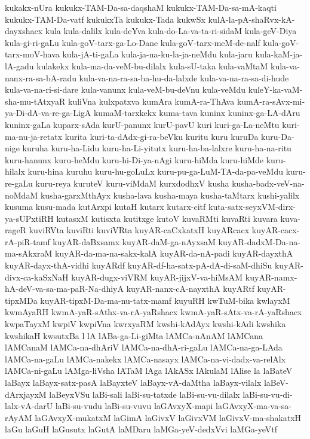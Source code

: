 {kukakx-nUra
kukukx-TAM-Da-sa-daqshaM
kukukx-TAM-Da-sa-mA-kaqti
kukukx-TAM-Da-vatf
kukukxTa
kukukx-Tada
kukwSx
kulA-la-pA-shaRvx-kA-dayxshacx
kula
kula-dalilx
kula-deYva
kula-do-La-va-ta-ri-sidaM
kula-geV-Diya
kula-gi-ri-gaLu
kula-goV-tarx-ga-Lo-Dane
kula-goV-tarx-meM-de-nalf
kula-goV-tarx-moV-hava
kula-jA-ti-gaLa
kula-ja-na-ku-la-ja-neMdu
kula-jaru
kula-kaM-ja-lA-gadu
kulakekx
kula-ma-da-veM-bu-dilalx
kula-sU-taka
kula-vaMtaM
kula-va-nanx-ra-sa-bA-radu
kula-va-na-ra-sa-ba-hu-da-lalxde
kula-va-na-ra-sa-di-hude
kula-va-na-ri-si-dare
kula-vanunx
kula-veM-bu-deVnu
kula-veMdu
kuleY-ka-vaM-sha-mu-tAtxyaR
kuliVna
kulxpatxva
kumAra
kumA-ra-ThAva
kumA-ra-sAvx-mi-ya-Di-dA-va-re-ga-LigA
kumaM-tarxkekx
kuma-tava
kuninx
kuninx-ga-LA-dAru
kuninx-gaLa
kuparx-sAda
kurU-panunx
kurU-pavU
kuri
kuri-ga-La-neMtu
kuri-ma-nu-ja-retatx
kurita
kuri-ta-dAdx-gi-ra-beVku
kuritu
kuru
kuruDa
kuru-Da-nige
kuruha
kuru-ha-Lidu
kuru-ha-Li-yitutx
kuru-ha-ba-lalxre
kuru-ha-na-ritu
kuru-hanunx
kuru-heMdu
kuru-hi-Di-ya-nAgi
kuru-hiMda
kuru-hiMde
kuru-hilalx
kuru-hina
kuruhu
kuru-hu-goLuLx
kuru-pu-ga-LuM-TA-da-pa-veMdu
kuru-re-gaLu
kuru-reya
kuruteV
kuru-viMdaM
kurxdodhxV
kusha
kusha-badx-veV-na-noMdaM
kusha-garxMthAyx
kusha-lava
kusha-maya
kusha-taMtarx
kushi-yalilx
kusuma
kusu-mada
kutArxpi
kutaH
kutarx
kutarx-citf
kuta-satx-seyxVM-dirx-ya-sUPxtiRH
kutasxM
kutisxta
kutitxge
kutoV
kuvaRMti
kuvaRti
kuvara
kuva-rageR
kuviRVta
kuviRti
kuviVRta
kuyAR-caCxkatxH
kuyARcacx
kuyAR-cacx-rA-piR-tamf
kuyAR-daBxsamx
kuyAR-daM-ga-nAyxsaM
kuyAR-dadxM-Da-na-ma-sAkxraM
kuyAR-da-ma-na-sakx-kalA
kuyAR-da-nA-padi
kuyAR-dayxthA
kuyAR-dayx-thA-vidhi
kuyARdf
kuyAR-df-ha-satx-pA-dA-di-saM-dhiSu
kuyAR-divx-ca-kaSxNaH
kuyAR-dugx-viVRM
kuyAR-jijxV-va-hiMsAM
kuyAR-namx-hA-deV-va-sa-ma-paR-Na-dhiyA
kuyAR-nanx-cA-nayxthA
kuyARtf
kuyAR-tipxMDa
kuyAR-tipxM-Da-ma-nu-tatx-mamf
kuyuRH
kwTuM-bika
kwlayxM
kwmAyaRH
kwmA-yaR-sAthx-va-rA-yaRshacx
kwmA-yaR-sAtx-va-rA-yaRshacx
kwpaTayxM
kwpiV
kwpiVna
kwrxyaRM
kwshi-kAdAyx
kwshi-kAdi
kwshika
kwshikaH
kwsutxBa
l
lA
lABa-ga-Li-giMta
lAMCa-nAnAM
lAMCana
lAMCanaM
lAMCa-na-dhAriV
lAMCa-na-dhA-ri-gaLu
lAMCa-na-ga-LAda
lAMCa-na-gaLu
lAMCa-nakekx
lAMCa-nasayx
lAMCa-na-vi-dadx-va-relAlx
lAMCa-ni-gaLu
lAMga-liVsha
lATaM
lAga
lAkASx
lAkulaM
lAlise
la
laBateV
laBayx
laBayx-satx-pasA
laBayxteV
laBayx-vA-daMtha
laBayx-vilalx
laBeV-dArxjayxM
laBeyxVSu
laBi-sali
laBi-su-tatxde
laBi-su-vu-dilalx
laBi-su-vu-di-lalx-vA-darU
laBi-su-vudu
laBi-su-vuvu
laGAvxyX-mapi
laGAvxyX-ma-va-sa-rAyAM
laGAvxyX-mukatxM
laGimA
laGivxV
laGivxVM
laGivxV-ma-shakatxH
laGu
laGuH
laGusutx
laGutA
laMDaru
laMGa-yeV-dedxVvi
laMGa-yeVtf
}
